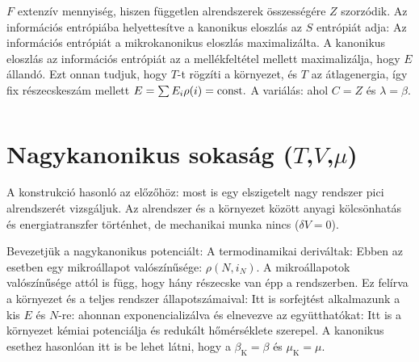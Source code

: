    $F$ extenzív mennyiség, hiszen független alrendszerek összességére $Z$ szorzódik. Az információs entrópiába helyettesítve a kanonikus eloszlás az $S$ entrópiát adja:
   Az információs entrópiát a mikrokanonikus eloszlás maximalizálta. A kanonikus eloszlás az információs entrópiát az a mellékfeltétel mellett maximalizálja, hogy $E$ állandó. Ezt onnan tudjuk, hogy $T$-t rögzíti a környezet, és $T$ az átlagenergia, így fix részecskeszám mellett $E=\sum\limits_{}^{}E_i\rho(i)=\text{const.}$ A variálás:
   ahol $C=Z$ és $\lambda=\beta$. 
   
  \section{Nagykanonikus sokaság ($T$,$V$,$\mu$)}
   
   A konstrukció hasonló az előzőhöz: most is egy elszigetelt nagy rendszer pici alrendszerét vizsgáljuk. Az alrendszer és a környezet között anyagi kölcsönhatás és energiatranszfer történhet, de mechanikai munka nincs ($\delta V=0$). 
   
   Bevezetjük a nagykanonikus potenciált:
   A termodinamikai deriváltak:
   Ebben az esetben egy mikroállapot valószínűsége: $\rho(N,i_N)$. A mikroállapotok valószínűsége attól is függ, hogy hány részecske van épp a rendszerben. Ez felírva a környezet és a teljes rendszer állapotszámaival:
   Itt is sorfejtést alkalmazunk a kis $E$ és $N$-re:
   ahonnan exponencializálva és elnevezve az együtthatókat:
   Itt is a környezet kémiai potenciálja és redukált hőmérséklete szerepel. A kanonikus esethez hasonlóan itt is be lehet látni, hogy a $\beta_\text{K}=\beta$ és $\mu_\text{K}=\mu$.
   
